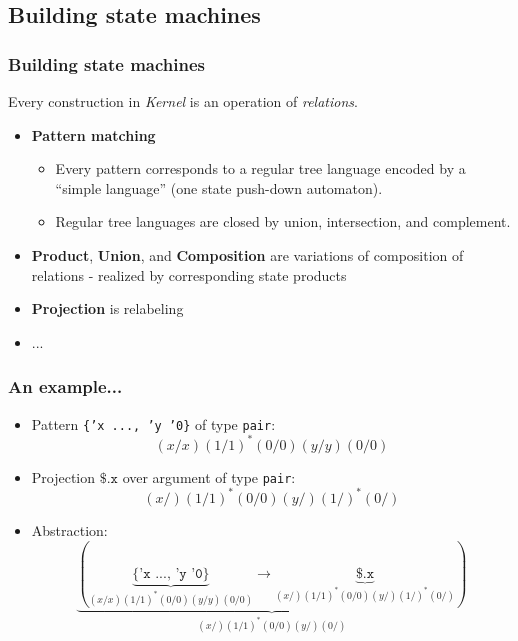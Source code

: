 \documentclass[utf8]{beamer}
\newcommand{\Kernel}{\textit{Kernel}}
\newcommand{\mypause}{\pause}
\begin{document}
\subsection{Building state machines} 
\begin{frame}
  \frametitle{Building state machines}
  Every construction in \Kernel{} is an operation of \emph{relations}.
  \begin{itemize}
  \item \textbf{Pattern matching} \mypause
    \begin{itemize}
    \item Every pattern corresponds to a regular tree language encoded
      by a ``simple language'' (one state push-down automaton).
    \item Regular tree languages are closed by union, intersection, and complement.
    \end{itemize} 
    \mypause
  \item \textbf{Product}, \textbf{Union}, and \textbf{Composition}
    \mypause are variations of composition of relations - realized by
    corresponding state products
    \mypause
  \item \textbf{Projection}  is relabeling
  \item ...
  \end{itemize}
\end{frame}

\begin{frame}
 \frametitle{An example...}
\begin{itemize}
\item Pattern \texttt{\{'x ..., 'y '0\}} of type \texttt{pair}:
  \[(x/x)(1/1)^{\ast}(0/0)(y/y)(0/0)\] \mypause

\item Projection $\texttt{\$.x}$ over argument of type \texttt{pair}:
  \[(x/)(1/1)^{\ast}(0/0)(y/)(1/)^{\ast}(0/)\] \mypause

\item Abstraction:
\[
  \underbrace{(\underbrace{\{\texttt{'x ..., 'y '0}\}}_{(x/x)(1/1)^{\ast}(0/0)(y/y)(0/0)} \rightarrow 
   \underbrace{\texttt{\$.x}}_{(x/)(1/1)^{\ast}(0/0)(y/)(1/)^{\ast}(0/)})}_{(x/)(1/1)^{\ast}(0/0)(y/)(0/)}
\]
\end{itemize}
\end{frame}
\end{document}
